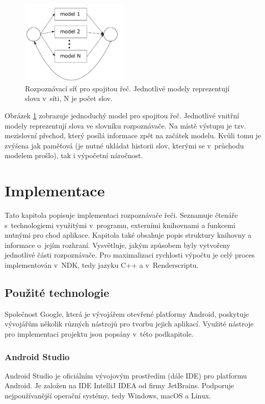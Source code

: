 \begin{figure}[H]\label{fig:continuous_speech}
	\centering
		\includegraphics[height=4cm]{obrazky-figures/continuous_speech_model.pdf}
        \caption{Rozpoznávací síť pro spojitou řeč. Jednotlivé modely reprezentují slova v~síti, N je počet slov.}
\end{figure}

Obrázek \ref{fig:continuous_speech} zobrazuje jednoduchý model pro spojitou řeč. Jednotlivé vnitřní modely reprezentují slova ve slovníku rozpoznávače. Na místě výstupu je tzv. mezislovní přechod, který posílá informace zpět na začátek modelu. Kvůli tomu je zvýšena jak paměťová (je nutné ukládat historii slov, kterými se v~průchodu modelem prošlo), tak i výpočetní náročnost.

\chapter{Implementace}
Tato kapitola popisuje implementaci rozpoznávače řeči. Seznamuje čtenáře s~technologiemi využitými v~programu, externími knihovnami a funkcemi nutnými pro chod aplikace. Kapitola také obsahuje popis struktury knihovny a informace o~jejím rozhraní. Vysvětluje, jakým způsobem byly vytvořeny jednotlivé části rozpoznávače. Pro maximalizaci rychlosti výpočtu je celý proces implementován v~NDK, tedy jazyku C++ a v~Renderscriptu.

\section{Použité technologie}
Společnost Google, která je vývojářem otevřené platformy Android, poskytuje vývojářům několik různých nástrojů pro tvorbu jejich aplikací. Využité nástroje pro implementaci projektu jsou popsány v~této podkapitole.

\subsection{Android Studio}
Android Studio je oficiálním vývojovým prostředím (dále IDE) pro platformu Android. Je založen na IDE IntelliJ IDEA od firmy JetBrains. Podporuje nejpoužívanější operační systémy, tedy Windows, macOS a Linux. 


